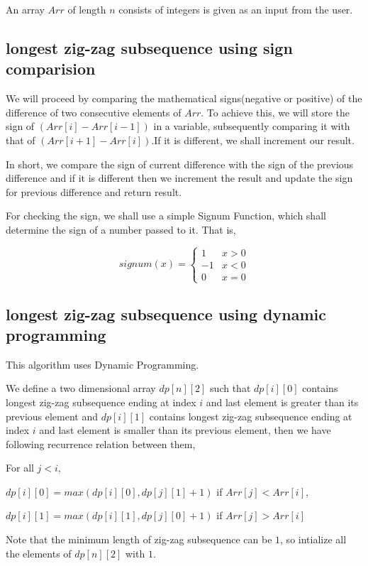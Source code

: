 \documentclass[conference]{IEEEtran}
\begin{document}
An array $Arr$ of length $n$ consists of integers is given as an input from the user. 



\subsection{longest zig-zag subsequence using sign comparision}

We will proceed by comparing the mathematical signs(negative or positive) of the difference of two consecutive elements of $Arr$. To achieve this, we will store the sign of $(Arr[i]-Arr[i-1])$ in a variable, subsequently comparing it with that of $(Arr[i+1]-Arr[i])$.If it is different, we shall increment our result. 

In short, we compare the sign of current difference with the sign of the previous difference and if it is different then we increment the result and update the sign for previous difference and return result.

For checking the sign, we shall use a simple Signum Function, which shall determine the sign of a number passed to it. That is,

\[signum(x) =  \begin{cases} 
      1 & x > 0\\
      -1 & x<0\\
      0 & x=0
   \end{cases}
\]

\subsection{longest zig-zag subsequence using dynamic programming}
This algorithm uses Dynamic Programming.

We define a two dimensional array $dp[n][2]$ such that $dp[i][0]$ contains longest zig-zag subsequence ending at index $i$ and last element is greater than its previous element and $dp[i][1]$ contains longest zig-zag subsequence ending at index $i$ and last element is smaller than its previous element, then we have following recurrence relation between them,

For all $j<i$,

$dp[i][0] = max(dp[i][0],dp[j][1]+1)$ if $Arr[j]<Arr[i]$,

$dp[i][1] = max(dp[i][1],dp[j][0]+1)$ if $Arr[j]>Arr[i]$

Note that the minimum length of zig-zag subsequence can be $1$, so intialize all the elements of $dp[n][2]$ with $1$.
\end{document}
